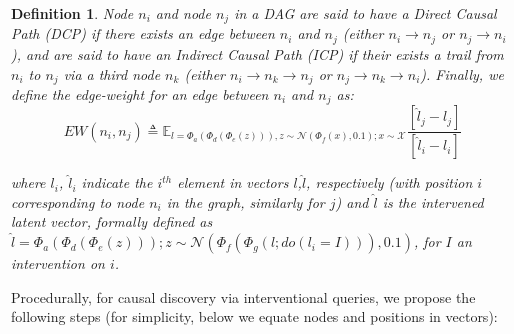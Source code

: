 \documentclass{article}
\newcommand{\ftcom}[2][]{\todo[author=FT, #1]{#2}}
\newcommand{\node}[1]{\ensuremath{n}_{#1}}
\newtheorem{dfn}{Definition}
\begin{document}
\begin{dfn}
Node $\node{i}$ and node $\node{j}$ in a DAG
are said to have a \emph{Direct Causal Path (DCP)} if there exists an edge between $\node{i}$ and $\node{j}$
(either $\node{i} \rightarrow \node{j}$ or $\node{j} \rightarrow \node{i}$), and are said to have an \emph{Indirect Causal Path (ICP)} if their exists a trail from $\node{i}$ to $\node{j}$ via a third node $\node{k}$ (either $\node{i} \rightarrow \node{k} \rightarrow \node{j}$ or $\node{j} \rightarrow \node{k} \rightarrow \node{i}$).
Finally, we define the \emph{edge-weight} for an edge between $\node{i}$ and $\node{j}$ as:
\begin{equation}
    EW(\node{i},\node{j}) \triangleq \mathbb{E}_{l=\Phi_a(\Phi_d(\Phi_e(z))), z \sim \mathcal{N}(\Phi_f(x), 0.1); x\sim \mathcal{X}} \frac{[\hat{l}_{j} - l_{j}]}{[\hat{l}_{i} - l_{i}]}
    \label{eqn:edgeweightage}
\end{equation}

where $l_i$, $\hat{l}_i$ indicate the $i^{th}$ element in vectors $l$,$\hat{l}$, respectively (with position $i$ corresponding to node $\node{i}$ in the graph, similarly for $j$)
and $\hat{l}$ is the \emph{intervened latent vector}, formally defined as  $\hat{l}= \Phi_a(\Phi_d(\Phi_e(z))); z \sim \mathcal{N}(\Phi_f(\Phi_g(l; do(l_i=I))), 0.1)$, for $I$ an intervention on $i$. 

\label{prp:causalstructure}
\end{dfn}


Procedurally, for causal discovery via interventional queries, we propose the following steps (for simplicity, below we equate nodes and positions in vectors): 
\end{document}
